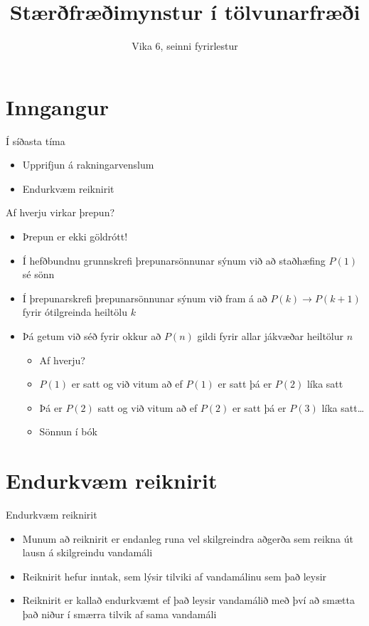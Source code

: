 \documentclass[handout]{beamer}
\title{Stærðfræðimynstur í tölvunarfræði}
\subtitle{Vika 6, seinni fyrirlestur}
\begin{document}
\begin{frame}
\titlepage
\end{frame}


\section{Inngangur}

\begin{frame}{Í síðasta tíma}
\begin{itemize}
 \item Upprifjun á rakningarvenslum
 \item Endurkvæm reiknirit
\end{itemize}
\end{frame}

\begin{frame}{Af hverju virkar þrepun?}
\begin{itemize}
 \item Þrepun er ekki göldrótt!
 \item Í hefðbundnu grunnskrefi þrepunarsönnunar sýnum við að staðhæfing $P(1)$ sé sönn
 \item Í þrepunarskrefi þrepunarsönnunar sýnum við fram á að $P(k) \to P(k+1)$ fyrir ótilgreinda heiltölu $k$
 \item Þá getum við séð fyrir okkur að $P(n)$ gildi fyrir allar jákvæðar heiltölur $n$
 \begin{itemize}
  \item Af hverju?
  \item $P(1)$ er satt og við vitum að ef $P(1)$ er satt þá er $P(2)$ líka satt
  \item Þá er $P(2)$ satt og við vitum að ef $P(2)$ er satt þá er $P(3)$ líka satt\ldots
  \item Sönnun í bók
 \end{itemize}
\end{itemize}
\end{frame}

\section{Endurkvæm reiknirit}

\begin{frame}{Endurkvæm reiknirit}
\begin{itemize}
 \item Munum að reiknirit er endanleg runa vel skilgreindra aðgerða sem reikna út lausn á skilgreindu vandamáli
 \item Reiknirit hefur inntak, sem lýsir tilviki af vandamálinu sem það leysir
 \item Reiknirit er kallað endurkvæmt ef það leysir vandamálið með því að smætta það niður í smærra tilvik af sama vandamáli
\end{itemize}
\end{frame}
\end{document}
